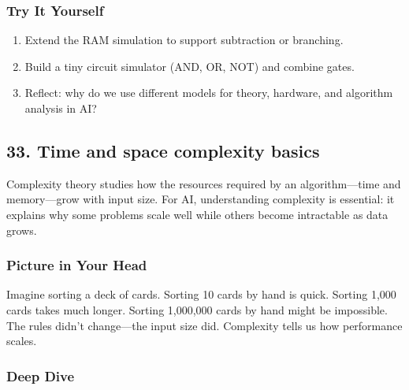 \documentclass[
  letterpaper,
  DIV=11,
  numbers=noendperiod]{scrreprt}
\providecommand{\tightlist}{%
  \setlength{\itemsep}{0pt}\setlength{\parskip}{0pt}}
\begin{document}
\subsubsection{Try It Yourself}\label{try-it-yourself-31}

\begin{enumerate}
\def\labelenumi{\arabic{enumi}.}
\tightlist
\item
  Extend the RAM simulation to support subtraction or branching.
\item
  Build a tiny circuit simulator (AND, OR, NOT) and combine gates.
\item
  Reflect: why do we use different models for theory, hardware, and
  algorithm analysis in AI?
\end{enumerate}

\subsection{33. Time and space complexity
basics}\label{time-and-space-complexity-basics}

Complexity theory studies how the resources required by an
algorithm---time and memory---grow with input size. For AI,
understanding complexity is essential: it explains why some problems
scale well while others become intractable as data grows.

\subsubsection{Picture in Your Head}\label{picture-in-your-head-32}

Imagine sorting a deck of cards. Sorting 10 cards by hand is quick.
Sorting 1,000 cards takes much longer. Sorting 1,000,000 cards by hand
might be impossible. The rules didn't change---the input size did.
Complexity tells us how performance scales.

\subsubsection{Deep Dive}\label{deep-dive-32}
\end{document}
